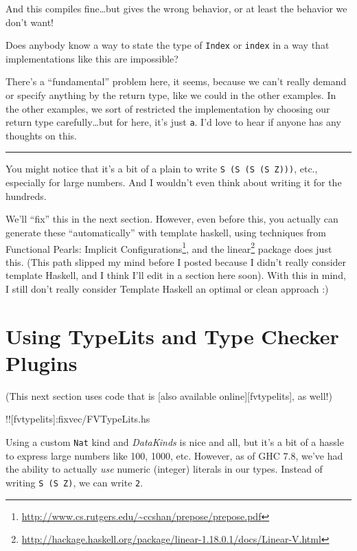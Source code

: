 \documentclass[]{article}
\renewcommand{\href}[2]{#2\footnote{\url{#1}}}
\begin{document}
And this compiles fine\ldots{}but gives the wrong behavior, or at least
the behavior we don't want!

Does anybody know a way to state the type of \texttt{Index} or
\texttt{index} in a way that implementations like this are impossible?

There's a ``fundamental'' problem here, it seems, because we can't
really demand or specify anything by the return type, like we could in
the other examples. In the other examples, we sort of restricted the
implementation by choosing our return type carefully\ldots{}but for
here, it's just \texttt{a}. I'd love to hear if anyone has any thoughts
on this.

\begin{center}\rule{0.5\linewidth}{\linethickness}\end{center}

You might notice that it's a bit of a plain to write
\texttt{S\ (S\ (S\ (S\ Z)))}, etc., especially for large numbers. And I
wouldn't even think about writing it for the hundreds.

We'll ``fix'' this in the next section. However, even before this, you
actually can generate these ``automatically'' with template haskell,
using techniques from
\href{http://www.cs.rutgers.edu/~ccshan/prepose/prepose.pdf}{Functional
Pearls: Implicit Configurations}, and the
\href{http://hackage.haskell.org/package/linear-1.18.0.1/docs/Linear-V.html}{linear}
package does just this. (This path slipped my mind before I posted
because I didn't really consider template Haskell, and I think I'll edit
in a section here soon). With this in mind, I still don't really
consider Template Haskell an optimal or clean approach :)

\section{Using TypeLits and Type Checker
Plugins}\label{using-typelits-and-type-checker-plugins}

(This next section uses code that is {[}also available
online{]}{[}fvtypelits{]}, as well!)

!!{[}fvtypelits{]}:fixvec/FVTypeLits.hs

Using a custom \texttt{Nat} kind and \emph{DataKinds} is nice and all,
but it's a bit of a hassle to express large numbers like 100, 1000, etc.
However, as of GHC 7.8, we've had the ability to actually \emph{use}
numeric (integer) literals in our types. Instead of writing
\texttt{S\ (S\ Z)}, we can write \texttt{2}.
\end{document}
